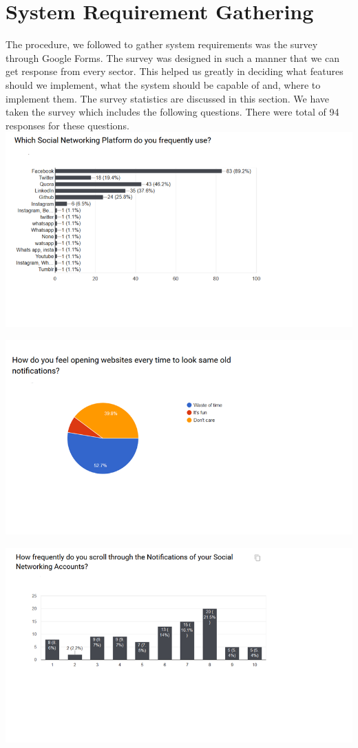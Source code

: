 \documentclass[12pt]{article}
\begin{document}
\section{System Requirement Gathering}
The procedure, we followed to gather system requirements was the survey
through Google Forms. The survey was designed in such a manner that we can
get response from every sector. This helped us greatly in deciding what features
should we implement, what the system should be capable of and, where to
implement them. The survey statistics are discussed in this section.
We have taken the survey which includes the following questions. There were
total of 94 responses for these questions.\\

\includegraphics[width=\linewidth]{srs1.png}
  
  
  \includegraphics[width=\linewidth]{srs2.png}
  
  \includegraphics[width=\linewidth]{srs3.png}
  
\end{document}

